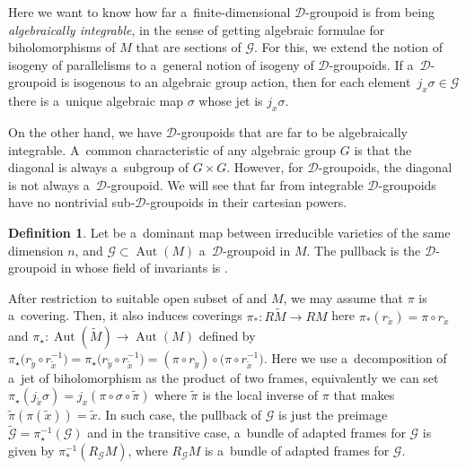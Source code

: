 \documentclass[10pt,a4paper]{amsart}
\numberwithin{equation}{section}
\theoremstyle{definition}
\newtheorem{Definition}[Theorem]{Definition}
\begin{document}
Here we want to know how far a~finite-dimensional $\mathcal D$-groupoid is from being \emph{algebraically integrable}, in the sense of getting algebraic formulae for biholomorphisms of $M$ that are sections of $\mathcal G$. For this, we extend the notion of isogeny of parallelisms to a~general notion of isogeny of $\mathcal D$-groupoids. If a~$\mathcal D$-groupoid is isogenous to an algebraic group action, then for each element~${j_x\sigma\in \mathcal G}$ there is a~unique algebraic map $\sigma$ whose jet is $j_x\sigma$.

On the other hand, we have $\mathcal D$-groupoids that are far to be algebraically integrable. A~common characteristic of any algebraic group $G$ is that the diagonal is always a~subgroup of $G\times G$. However, for $\mathcal D$-groupoids, the diagonal is not always a~$\mathcal D$-groupoid. We will see that far from integrable $\mathcal D$-groupoids have no nontrivial sub-$\mathcal D$-groupoids in their cartesian powers.

\begin{Definition}
Let  be a~dominant map between irreducible
varieties of the same dimension $n$, and $\mathcal G\subset \operatorname{Aut}(M)$ a~$\mathcal D$-groupoid in $M$.
The pullback 
is the $\mathcal D$-groupoid in  whose field of invariants is .
\end{Definition}

After restriction to suitable open subset of  and $M$, we may assume that $\pi$ is a~covering. Then, it also induces coverings $\pi_*\colon R\widetilde M \to RM$ here $\pi_*(r_{\widetilde x})= \pi \circ r_{\widetilde x}$ and $\pi_\star\colon \operatorname{Aut}(\widetilde M) \to \operatorname{Aut}(M)$ defined by
$\pi_{\star}\bigl(r_{\widetilde y} \circ r_{\widetilde x}^{-1}\bigr) =
\pi_{\star}\bigl(r_{\widetilde y} \circ r_{\widetilde x}^{-1}\bigr) = (\pi\circ r_{\widetilde y}) \circ \bigl(\pi \circ r_{\widetilde x}^{-1}\bigr)$. Here we use a~decomposition of a~jet of biholomorphism as the product of two frames, equivalently we can set $\pi_\star(j_{\widetilde x}\sigma) = j_x (\pi\circ \sigma \circ \widetilde\pi)$
where $\widetilde\pi$ is the local inverse of $\pi$ that makes $\widetilde\pi(\pi(\widetilde x)) = \widetilde x$. In such case, the pullback of $\mathcal G$ is just the preimage $\widetilde{\mathcal G} = \pi_\star^{-1}(\mathcal G)$ and in the transitive case, a~bundle of adapted frames for $\mathcal G$ is given by $\pi_{*}^{-1}(R_{\mathcal G} M)$, where $R_{\mathcal G} M$ is a~bundle of adapted frames for $\mathcal G$.
\end{document}
